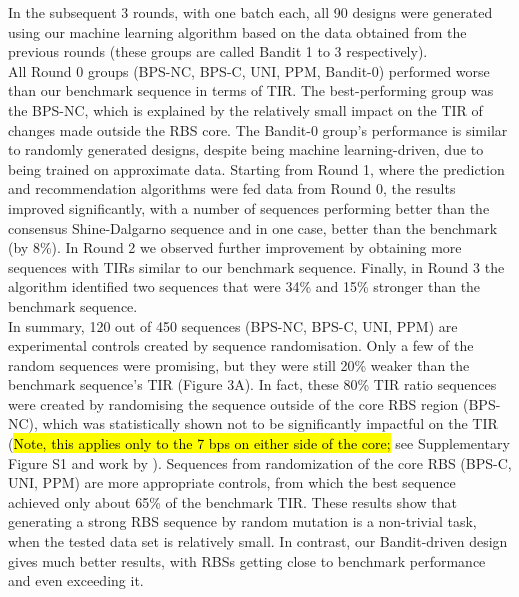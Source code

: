 \documentclass{scrartcl}[2013/05/29]%
\begin{document}
In the subsequent 3 rounds, with one batch each, all 90 designs were generated using our machine learning algorithm based on the data obtained from the previous rounds (these groups are called Bandit 1 to 3 respectively).\\

All Round 0 groups (BPS-NC, BPS-C, UNI, PPM, Bandit-0) performed worse than our benchmark sequence in terms of TIR.
The best-performing group was the BPS-NC, which is explained by the relatively small impact on the TIR of changes made outside the RBS core.
The Bandit-0 group's performance is similar to randomly generated designs, despite being machine learning-driven, due to being trained on approximate data.
Starting from Round 1, where the prediction and recommendation algorithms were fed data from Round 0, the results improved significantly, with a number of sequences performing better than the consensus Shine-Dalgarno sequence and in one case, better than the benchmark (by 8\%).
In Round 2 we observed further improvement by obtaining more sequences with TIRs similar to our benchmark sequence.
Finally, in Round 3 the algorithm identified two sequences that were 34\% and 15\% stronger than the benchmark sequence.\\

In summary, 120 out of 450 sequences (BPS-NC, BPS-C, UNI, PPM) are experimental controls created by sequence randomisation.
Only a few of the random sequences were promising, but they were still 20\% weaker than the benchmark sequence's TIR (Figure 3A).
In fact, these 80\% TIR ratio sequences were created by randomising the sequence outside of the core RBS region (BPS-NC), which was statistically shown not to be significantly impactful on the TIR (\hl{Note, this applies only to the 7 bps on either side of the core; }see Supplementary Figure S1 and work by \mbox{\textcite{Jeschek2016}}). Sequences from randomization of the core RBS (BPS-C, UNI, PPM) are more appropriate controls, from which the best sequence achieved only about 65\% of the benchmark TIR.
These results show that generating a strong RBS sequence by random mutation is a non-trivial task, when the tested data set is relatively small.
In contrast, our Bandit-driven design gives much better results, with RBSs getting close to benchmark performance and even exceeding it.\\
\end{document}
